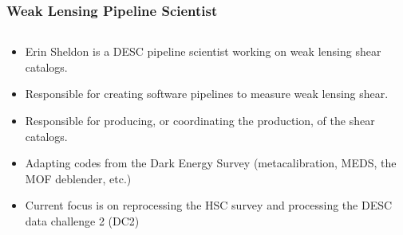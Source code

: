 \documentclass{beamer}
\begin{document}
\frame
{

    \frametitle{Weak Lensing Pipeline Scientist}

    \begin{columns}
        \begin{column}{0.7\textwidth}


            \begin{itemize}

                \item Erin Sheldon is a DESC 
                    pipeline scientist working on weak lensing
                    shear catalogs.

                \item Responsible for creating software 
                    pipelines to measure weak lensing shear.

                \item Responsible for producing, or coordinating
                    the production, of the shear catalogs.

                \item Adapting codes from the Dark
                    Energy Survey (metacalibration, MEDS,
                    the MOF deblender, etc.)

                \item Current focus is on reprocessing the HSC survey
                    and processing the DESC data challenge 2 (DC2)

            \end{itemize}


        \end{column}


\end{columns}}
\end{document}
